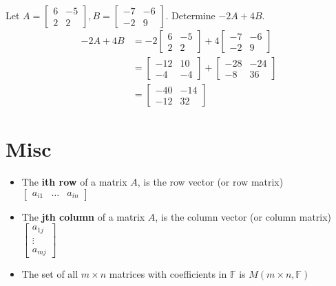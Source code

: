 \documentclass[letterpaper,12pt]{article}
\begin{document}
\begin{example}
Let $A = \begin{bmatrix} 6 & -5 \\ 2 & 2 \end{bmatrix}, B = \begin{bmatrix} -7 & -6 \\ -2 & 9 \end{bmatrix}$. Determine $-2A + 4B$.
\begin{align*}
    -2A + 4B & = -2 \begin{bmatrix} 6 & -5 \\ 2 & 2 \end{bmatrix} + 4 \begin{bmatrix} -7 & -6 \\ -2 & 9 \end{bmatrix} \\
    & = \begin{bmatrix} -12 & 10 \\ -4 & -4 \end{bmatrix} + \begin{bmatrix} -28 & -24 \\ -8 & 36 \end{bmatrix} \\
    & = \begin{bmatrix} -40 & -14 \\ -12 & 32 \end{bmatrix}
\end{align*}
\end{example}



\section*{Misc}
\begin{itemize}
    \item The \textbf{ith row} of a matrix $A$, is the row vector (or row matrix) $\begin{bmatrix} a_{i1} & \dots & a_{in} \end{bmatrix}$
    \item The \textbf{jth column} of a matrix $A$, is the column vector (or column matrix) $\begin{bmatrix} a_{1j} \\ \vdots \\ a_{mj} \end{bmatrix}$
    \item The set of all $m \times n$ matrices with coefficients in $\mathbb{F}$ is $M(m \times n, \mathbb{F})$
\end{itemize}
\end{document}
